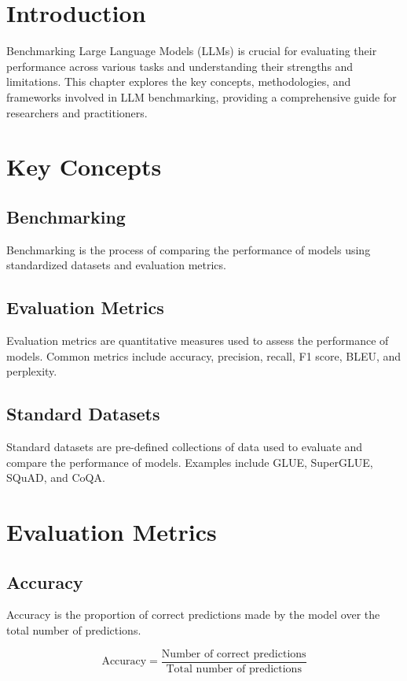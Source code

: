 \section{Introduction}
Benchmarking Large Language Models (LLMs) is crucial for evaluating their performance across various tasks and understanding their strengths and limitations. This chapter explores the key concepts, methodologies, and frameworks involved in LLM benchmarking, providing a comprehensive guide for researchers and practitioners.

\section{Key Concepts}

\subsection{Benchmarking}
Benchmarking is the process of comparing the performance of models using standardized datasets and evaluation metrics.

\subsection{Evaluation Metrics}
Evaluation metrics are quantitative measures used to assess the performance of models. Common metrics include accuracy, precision, recall, F1 score, BLEU, and perplexity.

\subsection{Standard Datasets}
Standard datasets are pre-defined collections of data used to evaluate and compare the performance of models. Examples include GLUE, SuperGLUE, SQuAD, and CoQA.

\section{Evaluation Metrics}

\subsection{Accuracy}
Accuracy is the proportion of correct predictions made by the model over the total number of predictions.

\begin{equation}
\text{Accuracy} = \frac{\text{Number of correct predictions}}{\text{Total number of predictions}}
\end{equation}

